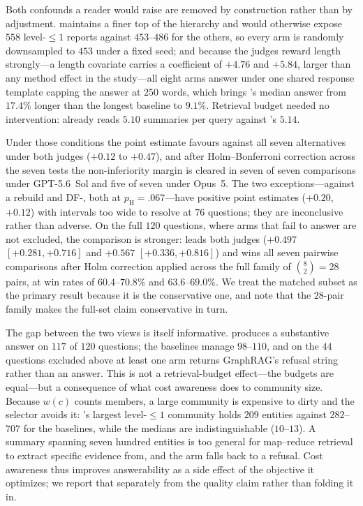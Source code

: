 Both confounds a reader would raise are removed by construction rather than by
adjustment. \DyLo{} maintains a finer top of the hierarchy and would otherwise
expose $558$ level-$\le1$ reports against $453$--$486$ for the others, so every
arm is randomly downsampled to $453$ under a fixed seed; and because the judges
reward length strongly---a length covariate carries a coefficient of $+4.76$ and
$+5.84$, larger than any method effect in the study---all eight arms answer under
one shared response template capping the answer at $250$ words, which brings
\DyLo{}'s median answer from $17.4\%$ longer than the longest baseline to
$9.1\%$. Retrieval budget needed no intervention: \DyLo{} already reads $5.10$
summaries per query against \QCA{}'s $5.14$.

Under those conditions the point estimate favours \DyLo{} against all seven
alternatives under both judges ($+0.12$ to $+0.47$), and after Holm--Bonferroni
correction across the seven tests the non-inferiority margin is cleared in seven
of seven comparisons under GPT-5.6~Sol and five of seven under Opus~5. The two
exceptions---against a rebuild and DF-\Louvain{}, both at $p_{\text{H}}=.067$---have
positive point estimates ($+0.20$, $+0.12$) with intervals too wide to resolve at
$76$ questions; they are inconclusive rather than adverse. On the full $120$
questions, where arms that fail to answer are not excluded, the comparison is
stronger: \DyLo{} leads both judges ($+0.497$ $[+0.281,+0.716]$ and $+0.567$
$[+0.336,+0.816]$) and wins all seven pairwise comparisons after Holm correction
applied across the full family of $\binom{8}{2}=28$ pairs, at win rates of
$60.4$--$70.8\%$ and $63.6$--$69.0\%$. We treat the matched subset as the primary
result because it is the conservative one, and note that the $28$-pair family
makes the full-set claim conservative in turn.

The gap between the two views is itself informative. \DyLo{} produces a
substantive answer on $117$ of $120$ questions; the baselines manage $98$--$110$,
and on the $44$ questions excluded above at least one arm returns GraphRAG's
refusal string rather than an answer. This is not a retrieval-budget effect---the
budgets are equal---but a consequence of what cost awareness does to community
size. Because $w(c)$ counts members, a large community is expensive to dirty and
the selector avoids it: \DyLo{}'s largest level-$\le1$ community holds $209$
entities against $282$--$707$ for the baselines, while the medians are
indistinguishable ($10$--$13$). A summary spanning seven hundred entities is too
general for map--reduce retrieval to extract specific evidence from, and the arm
falls back to a refusal. Cost awareness thus improves answerability as a side
effect of the objective it optimizes; we report that separately from the quality
claim rather than folding it in.
